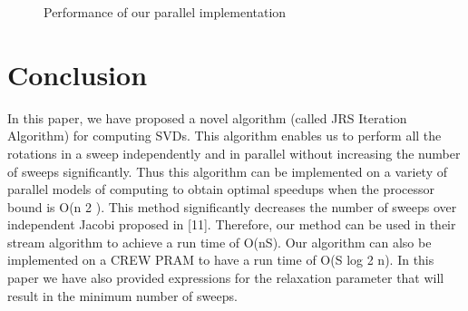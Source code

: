 \documentclass[10pt, conference, compsocconf]{IEEEtran}
\begin{document}
\begin{figure}[!htb]
\centering
{} \hfill
{}
\caption{Performance of our parallel implementation}
\end{figure}

\section{Conclusion}

In this paper, we have proposed a novel algorithm (called
JRS Iteration Algorithm) for computing SVDs. This algorithm
enables us to perform all the rotations in a sweep independently
and in parallel without increasing the number of sweeps
significantly. Thus this algorithm can be implemented on a
variety of parallel models of computing to obtain optimal
speedups when the processor bound is O(n 2 ). This method
significantly decreases the number of sweeps over independent
Jacobi proposed in [11]. Therefore, our method can be used
in their stream algorithm to achieve a run time of O(nS). Our
algorithm can also be implemented on a CREW PRAM to have
a run time of O(S log 2 n). In this paper we have also provided
expressions for the relaxation parameter that will result in the
minimum number of sweeps.

%
%
%
\end{document}
